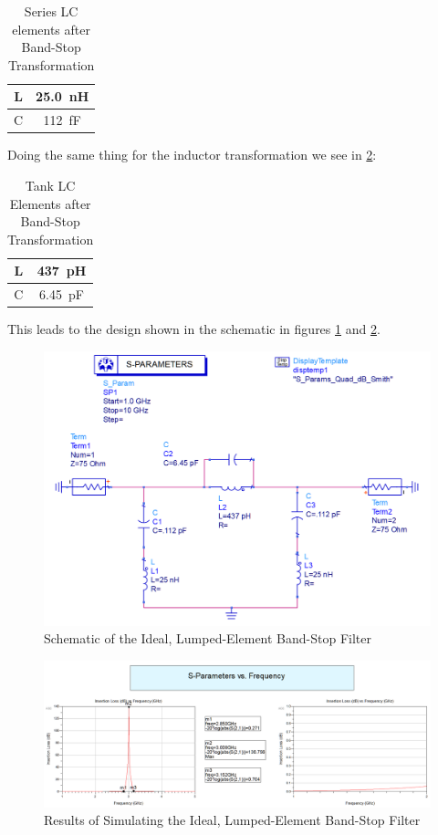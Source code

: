 \begin{table}[H]
    \centering
    \caption{Series LC elements after Band-Stop Transformation}
    \label{tab:2_series_elements}
    \begin{tabular}{|c|c|}
        \hline L & \SI{25.0}{\nano\henry} \\
        \hline C & \SI{112}{\femto\farad} \\
        \hline
    \end{tabular}
\end{table}

Doing the same thing for the inductor transformation we see in
\ref{tab:2_tank_elements}:

\begin{table}[H]
    \centering
    \caption{Tank LC Elements after Band-Stop Transformation}
    \label{tab:2_tank_elements}
    \begin{tabular}{|c|c|}
    \hline L & \SI{437}{\pico\henry} \\
    \hline C & \SI{6.45}{\pico\farad} \\
    \hline
    \end{tabular}
\end{table}

This leads to the design shown in the schematic in figures
\ref{fig:img/Problem2/IdealSchematic.PNG} and
\ref{fig:img/Problem2/IdealResults.PNG}.

\begin{figure}[H]
    \centering
    \includegraphics[width=0.8\linewidth]{img/Problem2/IdealSchematic.PNG}
    \caption{Schematic of the Ideal, Lumped-Element Band-Stop Filter}
    \label{fig:img/Problem2/IdealSchematic.PNG}
\end{figure}

\begin{figure}[H]
    \centering
    \includegraphics[width=0.8\linewidth]{img/Problem2/IdealResults.PNG}
    \caption{Results of Simulating the Ideal, Lumped-Element Band-Stop Filter}
    \label{fig:img/Problem2/IdealResults.PNG}
\end{figure}

